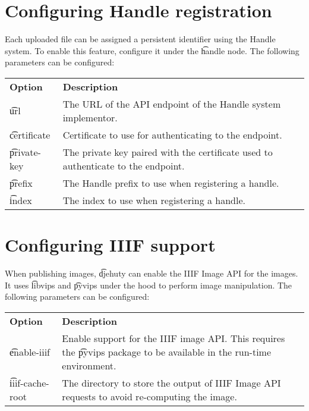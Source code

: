 \section{Configuring Handle registration}

  Each uploaded file can be assigned a persistent identifier using the Handle
  system.  To enable this feature, configure it under the \t{handle} node.
  The following parameters can be configured:

\begin{tabularx}{\textwidth}{*{1}{!{\VRule[-1pt]}l}!{\VRule[-1pt]}X}
  \headrow
  \textbf{Option}             & \textbf{Description}\\
  \t{url}                     & The URL of the API endpoint of the Handle
                                system implementor.\\
  \t{certificate}             & Certificate to use for authenticating to the
                                endpoint.\\
  \t{private-key}             & The private key paired with the certificate
                                used to authenticate to the endpoint.\\
  \t{prefix}                  & The Handle prefix to use when registering a
                                handle.\\
  \t{index}                   & The index to use when registering a handle.
\end{tabularx}

\section{Configuring IIIF support}

  When publishing images, \t{djehuty} can enable the IIIF Image API for the
  images. It uses \t{libvips} and \t{pyvips} under the hood to perform image
  manipulation.  The following parameters can be configured:

\begin{tabularx}{\textwidth}{*{1}{!{\VRule[-1pt]}l}!{\VRule[-1pt]}X}
  \headrow
  \textbf{Option}             & \textbf{Description}\\
  \t{enable-iiif}             & Enable support for the IIIF image API.  This
                                requires the \t{pyvips} package to be available
                                in the run-time environment.\\
  \t{iiif-cache-root}         & The directory to store the output of IIIF Image
                                API requests to avoid re-computing the image.
\end{tabularx}

